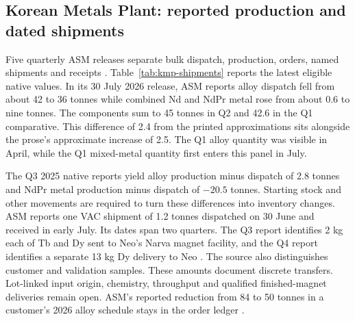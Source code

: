 \documentclass[11pt]{article}
\begin{document}
\subsection{Korean Metals Plant: reported production and dated shipments}
Five quarterly ASM releases separate bulk dispatch, production, orders, named shipments and receipts \citep{ASMKMP2025Q2,ASMKMP2025Q3,ASMKMP2025Q4,ASMKMP2026Q1,ASMKMP2026Q2}. Table~\ref{tab:kmp-shipments} reports the latest eligible native values. In its 30 July 2026 release, ASM reports alloy dispatch fell from about 42 to 36 tonnes while combined Nd and NdPr metal rose from about 0.6 to nine tonnes. The components sum to 45 tonnes in Q2 and 42.6 in the Q1 comparative. This difference of 2.4 from the printed approximations sits alongside the prose's approximate increase of 2.5. The Q1 alloy quantity was visible in April, while the Q1 mixed-metal quantity first enters this panel in July.
\begin{table}[htbp]\centering\small

\caption{Korean Metals Plant dispatches in reported tonnes. The combined Nd and NdPr category is shown only where available in comparable text. In 2025 Q3 the issuer separately reported 22.2 tonnes of NdPr-only metal dispatched.}\label{tab:kmp-shipments}
\end{table}

The Q3 2025 native reports yield alloy production minus dispatch of 2.8 tonnes and NdPr metal production minus dispatch of $-20.5$ tonnes. Starting stock and other movements are required to turn these differences into inventory changes. ASM reports one VAC shipment of 1.2 tonnes dispatched on 30 June and received in early July. Its dates span two quarters. The Q3 report identifies 2 kg each of Tb and Dy sent to Neo's Narva magnet facility, and the Q4 report identifies a separate 13 kg Dy delivery to Neo \citep{ASMKMP2025Q2,ASMKMP2025Q3,ASMKMP2025Q4}. The source also distinguishes customer and validation samples. These amounts document discrete transfers. Lot-linked input origin, chemistry, throughput and qualified finished-magnet deliveries remain open. ASM's reported reduction from 84 to 50 tonnes in a customer's 2026 alloy schedule stays in the order ledger \citep{ASMKMP2026Q1,ASMKMP2026Q2}.
\end{document}
